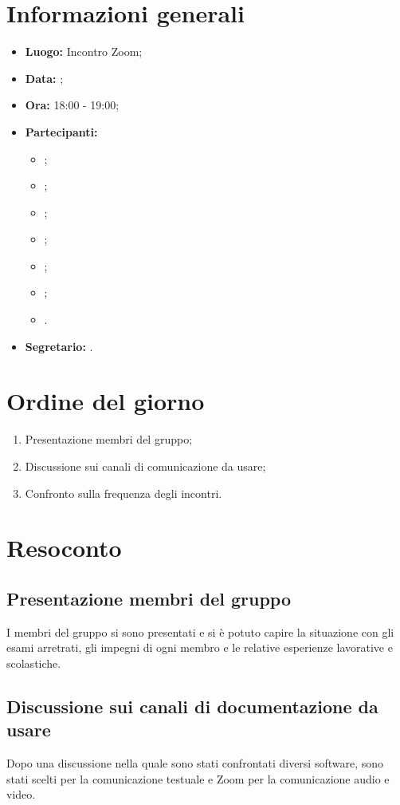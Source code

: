 \section{Informazioni generali}
\begin{itemize}
\item \textbf{Luogo:} Incontro Zoom;
\item \textbf{Data:} \Data;
\item \textbf{Ora:} 18:00 - 19:00;
\item \textbf{Partecipanti:}
	\begin{itemize}
		\item \BL{}; 
		\item \FF{};
		\item \MM{}; 
		\item \PC{};
		\item \TG{};
		\item \TL{};
		\item \VD{}.
	\end{itemize} 
\item \textbf{Segretario:} \PC{}.
\end{itemize}

\section{Ordine del giorno}
\begin{enumerate}
 \item Presentazione membri del gruppo;
 \item Discussione sui canali di comunicazione da usare;
 \item Confronto sulla frequenza degli incontri.
\end{enumerate}

\section{Resoconto}
\subsection{Presentazione membri del gruppo}
I membri del gruppo si sono presentati e si è potuto capire la situazione con gli esami arretrati, gli impegni di ogni membro e le relative esperienze lavorative e scolastiche.
\subsection{Discussione sui canali di documentazione da usare}
Dopo una discussione nella quale sono stati confrontati diversi software, sono stati scelti  per la comunicazione testuale e Zoom per la comunicazione audio e video.
